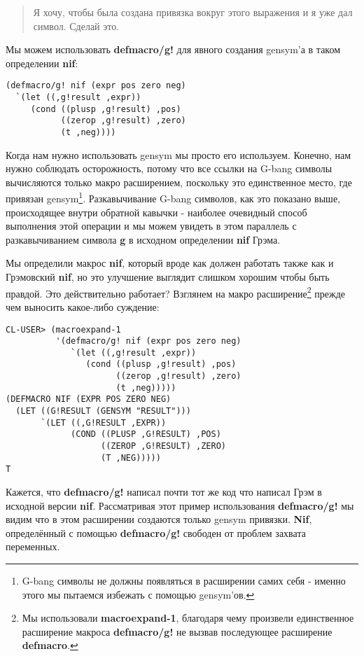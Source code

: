 \begin{quote}
Я хочу, чтобы была создана привязка вокруг этого выражения и я уже дал символ. Сделай это.
\end{quote}

Мы можем использовать \textbf{defmacro/g!} для явного создания gensym'а в таком определении \textbf{nif}:

\begin{verbatim}
(defmacro/g! nif (expr pos zero neg)
  `(let ((,g!result ,expr))
     (cond ((plusp ,g!result) ,pos)
           ((zerop ,g!result) ,zero)
           (t ,neg))))
\end{verbatim}

Когда нам нужно использовать gensym мы просто его используем. Конечно, нам нужно соблюдать осторожность, потому что все ссылки на G-bang символы вычисляются только макро расширением, поскольку это единственное место, где привязан gensym\footnote{G-bang символы не должны появляться в расширении самих себя - именно этого мы пытаемся избежать с помощью gensym'ов.}. Разкавычивание G-bang символов, как это показано выше, происходящее внутри обратной кавычки - наиболее очевидный способ выполнения этой операции и мы можем увидеть в этом параллель с разкавычиванием символа \textbf{g} в исходном определении \textbf{nif} Грэма.

Мы определили макрос \textbf{nif}, который вроде как должен работать также как и Грэмовский \textbf{nif}, но это улучшение выглядит слишком хорошим чтобы быть правдой. Это действительно работает? Взглянем на макро расширение\footnote{Мы использовали \textbf{macroexpand-1}, благодаря чему произвели единственное расширение макроса \textbf{defmacro/g!} не вызвав последующее расширение \textbf{defmacro}.} прежде чем выносить какое-либо суждение:

\begin{verbatim}
CL-USER> (macroexpand-1
          '(defmacro/g! nif (expr pos zero neg)
             `(let ((,g!result ,expr))
                (cond ((plusp ,g!result) ,pos)
                      ((zerop ,g!result) ,zero)
                      (t ,neg)))))
(DEFMACRO NIF (EXPR POS ZERO NEG)
  (LET ((G!RESULT (GENSYM "RESULT")))
       `(LET ((,G!RESULT ,EXPR))
             (COND ((PLUSP ,G!RESULT) ,POS) 
                   ((ZEROP ,G!RESULT) ,ZERO) 
                   (T ,NEG)))))
T
\end{verbatim}

Кажется, что \textbf{defmacro/g!} написал почти тот же код что написал Грэм в исходной версии \textbf{nif}. Рассматривая этот пример использования \textbf{defmacro/g!} мы видим что в этом расширении создаются только gensym привязки. \textbf{Nif}, определённый с помощью \textbf{defmacro/g!} свободен от проблем захвата переменных.

